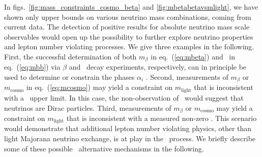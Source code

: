 In figs.~\ref{fig:mass_constraints_cosmo_beta} and \ref{fig:mbetabetavsmlight}, we have shown only upper bounds on various neutrino mass combinations, coming from current data. The detection of positive results for absolute neutrino mass scale observables would open up the possibility to further explore neutrino properties and lepton number violating processes. We give three examples in the following. First, the successful determination of both $m_{\beta}$ in eq.~(\ref{eq:mbeta}) and \mbb\ in eq.~(\ref{eq:mbb}) via $\beta$ and \bbonu\ decay experiments, respectively, can in principle be used to determine or constrain the phases $\alpha_{i}$ \cite{Avignone:2007fu}. Second, measurements of $m_{\beta}$ or $m_{\text{cosmo}}$ in eq.~(\ref{eq:mcosmo}) may yield a constraint on $m_{\text{light}}$ that is inconsistent with a \mbb\ upper limit. In this case, the non-observation of \bbonu\ would suggest that neutrinos are Dirac particles. Third, measurements of $m_{\beta}$ or $m_{\text{cosmo}}$ may yield a constraint on $m_{\text{light}}$ that is inconsistent with a measured non-zero \mbb. This scenario would demonstrate that additional lepton number violating physics, other than light Majorana neutrino exchange, is at play in the \bbonu\ process. We briefly describe some of these possible \bbonu\ alternative mechanisms in the following.


